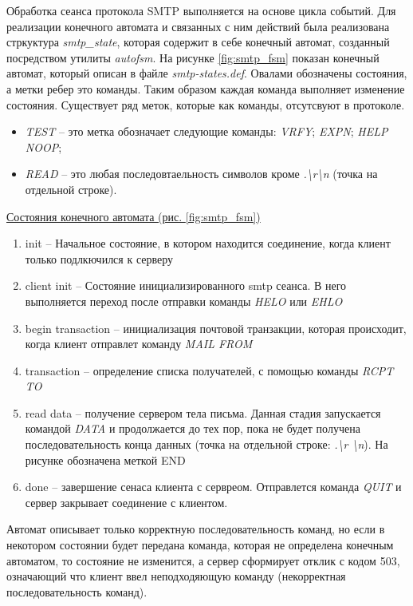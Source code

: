 \documentclass[a4paper,12pt]{report}
\begin{document}
    
    Обработка сеанса протокола SMTP выполняется на основе цикла событий. Для реализации конечного автомата и связанных с ним действий была реализована стркуктура \textit{smtp\_state}, которая содержит в себе конечный автомат, созданный посредством утилиты \textit{autofsm}. На рисунке \ref{fig:smtp_fsm} показан конечный автомат, который описан в файле \textit{smtp-states.def}. Овалами обозначены состояния, а метки ребер это команды. Таким образом каждая команда выполняет изменение состояния. Существует ряд меток, которые как команды, отсутсвуют в протоколе. 
    \begin{itemize}
        \item \textit{TEST} -- это метка обозначает следующие команды: \textit{VRFY}; \textit{EXPN}; \textit{HELP} \textit{NOOP}; 
        \item \textit{READ} -- это любая последовтаельность символов кроме \textit{.\textbackslash{}r\textbackslash{}n} (точка на отдельной строке).
    \end{itemize}
    
    \underline{Состояния конечного автомата (рис. \ref{fig:smtp_fsm})}
    \begin{enumerate}
        \item init -- Начальное состояние, в котором находится соединение, когда клиент только подлкючился к серверу
        \item client init -- Состояние инициализированного smtp сеанса. В него выполняется переход после отправки команды \textit{HELO} или \textit{EHLO}
        \item begin transaction -- инициализация почтовой транзакции, которая происходит, когда клиент отправлет команду \textit{MAIL FROM}
        \item transaction -- определение списка получателей, с помощью команды \textit{RCPT TO}
        \item  read data -- получение сервером тела письма. Данная стадия запускается командой \textit{DATA} и продолжается до тех пор, пока не будет получена последовательность конца данных (точка на отдельной строке: \textit{.\textbackslash{}r \textbackslash{}n}). На рисунке обозначена меткой END
        \item done -- завершение сенаса клиента с сервреом. Отправлется команда \textit{QUIT} и сервер закрывает соединение с клиентом.
    \end{enumerate}
    
    Автомат описывает только корректную последовательность команд, но если в некотором состоянии будет передана команда, которая не определена конечным автоматом, то состояние не изменится, а сервер сформирует отклик с кодом 503, означающий что клиент ввел неподходяющую команду (некорректная последовательность команд).
    
\end{document}
